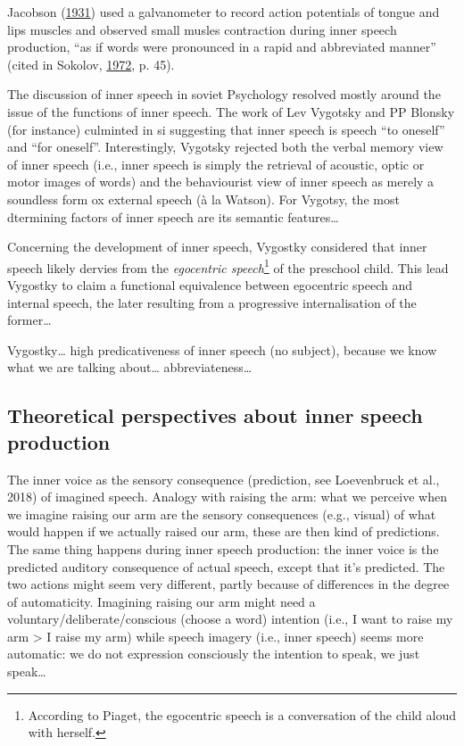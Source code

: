 \documentclass[a4paper,12pt,twoside,openright,oldfontcommands]{memoir}
\let\rmarkdownfootnote\footnote%
\def\footnote{\protect\rmarkdownfootnote}
\begin{document}
Jacobson (\protect\hyperlink{ref-jacobson_electrical_1931}{1931}) used a
galvanometer to record action potentials of tongue and lips muscles and
observed small musles contraction during inner speech production, ``as
if words were pronounced in a rapid and abbreviated manner'' (cited in
Sokolov, \protect\hyperlink{ref-sokolov_inner_1972}{1972}, p. 45).

The discussion of inner speech in soviet Psychology resolved mostly
around the issue of the functions of inner speech. The work of Lev
Vygotsky and PP Blonsky (for instance) culminted in si suggesting that
inner speech is speech ``to oneself'' and ``for oneself''.
Interestingly, Vygotsky rejected both the verbal memory view of inner
speech (i.e., inner speech is simply the retrieval of acoustic, optic or
motor images of words) and the behaviourist view of inner speech as
merely a soundless form ox external speech (à la Watson). For Vygotsy,
the most dtermining factors of inner speech are its semantic
features\ldots{}

Concerning the development of inner speech, Vygostky considered that
inner speech likely dervies from the \emph{egocentric speech}\footnote{According
  to Piaget, the egocentric speech is a conversation of the child aloud
  with herself.} of the preschool child. This lead Vygostky to claim a
functional equivalence between egocentric speech and internal speech,
the later resulting from a progressive internalisation of the
former\ldots{}

Vygostky\ldots{} high predicativeness of inner speech (no subject),
because we know what we are talking about\ldots{} abbreviateness\ldots{}

\subsection{Theoretical perspectives about inner speech
production}\label{theoretical-perspectives-about-inner-speech-production}

The inner voice as the sensory consequence (prediction, see Loevenbruck
et al., 2018) of imagined speech. Analogy with raising the arm: what we
perceive when we imagine raising our arm are the sensory consequences
(e.g., visual) of what would happen if we actually raised our arm, these
are then kind of predictions. The same thing happens during inner speech
production: the inner voice is the predicted auditory consequence of
actual speech, except that it's predicted. The two actions might seem
very different, partly because of differences in the degree of
automaticity. Imagining raising our arm might need a
voluntary/deliberate/conscious (choose a word) intention (i.e., I want
to raise my arm \textgreater{} I raise my arm) while speech imagery
(i.e., inner speech) seems more automatic: we do not expression
consciously the intention to speak, we just speak\ldots{}
\end{document}

